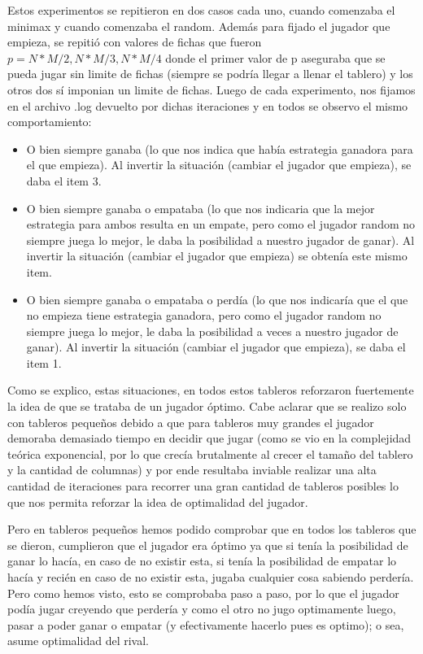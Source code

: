 \documentclass[A4paper,oneside,fleqn,11pt]{article}
\theoremstyle{definition}
\begin{document}
Estos experimentos se repitieron en dos casos cada uno, cuando comenzaba el minimax y cuando comenzaba el random. Además para fijado el jugador que empieza, se repitió con valores de fichas que fueron $p=N*M/2, N*M/3, N*M/4$ donde el primer valor de p aseguraba que se pueda jugar sin limite de fichas (siempre se podría llegar a llenar el tablero) y los otros dos sí imponian un limite de fichas. Luego de cada experimento, nos fijamos en el archivo .log devuelto por dichas iteraciones y en todos se observo el mismo comportamiento:
\begin{itemize}
\item O bien siempre ganaba (lo que nos indica que había estrategia ganadora para el que empieza). Al invertir la situación (cambiar el jugador que empieza), se daba el item 3.
\item O bien siempre ganaba o empataba (lo que nos indicaria que la mejor estrategia para ambos resulta en un empate, pero como el jugador random no siempre juega lo mejor, le daba la posibilidad a nuestro jugador de ganar). Al invertir la situación (cambiar el jugador que empieza) se obtenía este mismo item.
\item O bien siempre ganaba o empataba o perdía (lo que nos indicaría que el que no empieza tiene estrategia ganadora, pero como el jugador random no siempre juega lo mejor, le daba la posibilidad a veces a nuestro jugador de ganar). Al invertir la situación (cambiar el jugador que empieza), se daba el item 1.
\end{itemize}

Como se explico, estas situaciones, en todos estos tableros reforzaron fuertemente la idea de que se trataba de un jugador óptimo. Cabe aclarar que se realizo solo con tableros pequeños debido a que para tableros muy grandes el jugador demoraba demasiado tiempo en decidir que jugar (como se vio en la complejidad teórica exponencial, por lo que crecía brutalmente al crecer el tamaño del tablero y la cantidad de columnas) y por ende resultaba inviable realizar una alta cantidad de iteraciones para recorrer una gran cantidad de tableros posibles lo que nos permita reforzar la idea de optimalidad del jugador. 

Pero en tableros pequeños hemos podido comprobar que en todos los tableros que se dieron, cumplieron que el jugador era óptimo ya que si tenía la posibilidad de ganar lo hacía, en caso de no existir esta, si tenía la posibilidad de empatar lo hacía y recién en caso de no existir esta, jugaba cualquier cosa sabiendo perdería.  Pero como hemos visto, esto se comprobaba paso a paso, por lo que el jugador podía jugar creyendo que perdería y como el otro no jugo optimamente luego, pasar a poder ganar o empatar (y efectivamente hacerlo pues es optimo); o sea, asume optimalidad del rival.
\end{document}
